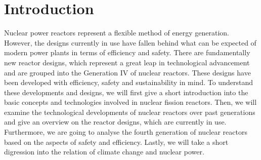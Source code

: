 \chapter{Introduction}
Nuclear power reactors represent a flexible method of energy generation. However, the designs
currently in use have fallen behind what can be expected of modern power plants in terms
of efficiency and safety. There are fundamentally new reactor designs, which represent
a great leap in technological advancement and are grouped into the Generation IV of nuclear reactors.
These designs have been developed with efficiency, safety and sustainability in mind.
To understand these developments and designs, we will first give a short introduction into the
basic concepts and technologies involved in nuclear fission reactors. Then, we will examine the
technological developments of nuclear reactors over past generations and give an overview on
the reactor designs, which are currently in use.
Furthermore, we are going to analyse the fourth generation
of nuclear reactors based on the aspects of safety and efficiency.
Lastly, we will take a short digression into the relation of climate change and nuclear power.